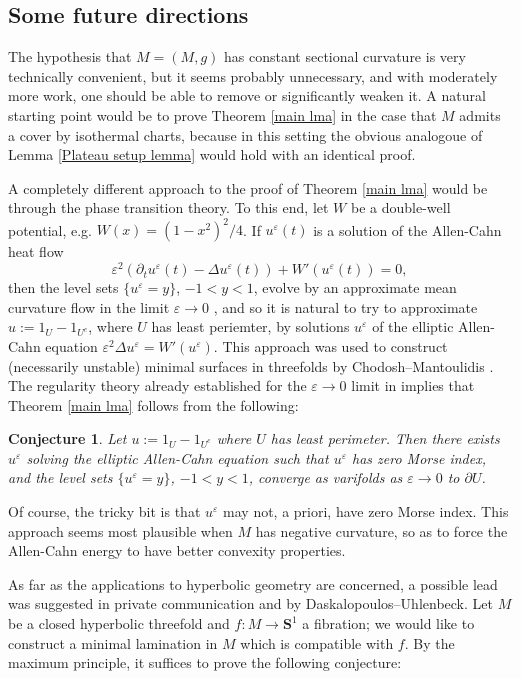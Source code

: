 \documentclass[reqno,10pt]{amsart}
\newcommand{\Sph}{\mathbf S}
\newtheorem{conjecture}[theorem]{Conjecture}
\theoremstyle{definition}
\numberwithin{equation}{section}
\begin{document}
\subsection{Some future directions}\label{open problems}
The hypothesis that $M = (M, g)$ has constant sectional curvature is very technically convenient, but it seems probably unnecessary, and with moderately more work, one should be able to remove or significantly weaken it.
A natural starting point would be to prove Theorem \ref{main lma} in the case that $M$ admits a cover by isothermal charts, because in this setting the obvious analogoue of Lemma \ref{Plateau setup lemma} would hold with an identical proof.

A completely different approach to the proof of Theorem \ref{main lma} would be through the phase transition theory. 
To this end, let $W$ be a double-well potential, e.g. $W(x) = (1 - x^2)^2/4$.
If $u^\varepsilon(t)$ is a solution of the Allen-Cahn heat flow
$$\varepsilon^2(\partial_t u^\varepsilon(t) - \Delta u^\varepsilon(t)) + W'(u^\varepsilon(t)) = 0,$$
then the level sets $\{u^\varepsilon = y\}$, $-1 < y < 1$, evolve by an approximate mean curvature flow in the limit $\varepsilon \to 0$ \cite{Guaraco}, and so it is natural to try to approximate $u := 1_U - 1_{U^c}$, where $U$ has least periemter, by solutions $u^\varepsilon$ of the elliptic Allen-Cahn equation $\varepsilon^2 \Delta u^\varepsilon = W'(u^\varepsilon)$.
This approach was used to construct (necessarily unstable) minimal surfaces in threefolds by Chodosh--Mantoulidis \cite{Chodosh_2020}.
The regularity theory already established for the $\varepsilon \to 0$ limit in \cite[Appendix B]{Guaraco} implies that Theorem \ref{main lma} follows from the following:

\begin{conjecture}
Let $u := 1_U - 1_{U^c}$ where $U$ has least perimeter. Then there exists $u^\varepsilon$ solving the elliptic Allen-Cahn equation such that $u^\varepsilon$ has zero Morse index, and the level sets $\{u^\varepsilon = y\}$, $-1 < y < 1$, converge as varifolds as $\varepsilon \to 0$ to $\partial U$.
\end{conjecture}

Of course, the tricky bit is that $u^\varepsilon$ may not, a priori, have zero Morse index.
This approach seems most plausible when $M$ has negative curvature, so as to force the Allen-Cahn energy to have better convexity properties.

As far as the applications to hyperbolic geometry are concerned, a possible lead was suggested in private communication and \cite[Problems 9.12--9.13]{daskalopoulos2020transverse} by Daskalopoulos--Uhlenbeck.
Let $M$ be a closed hyperbolic threefold and $f: M \to \Sph^1$ a fibration; we would like to construct a minimal lamination in $M$ which is compatible with $f$.
By the maximum principle, it suffices to prove the following conjecture:
\end{document}
